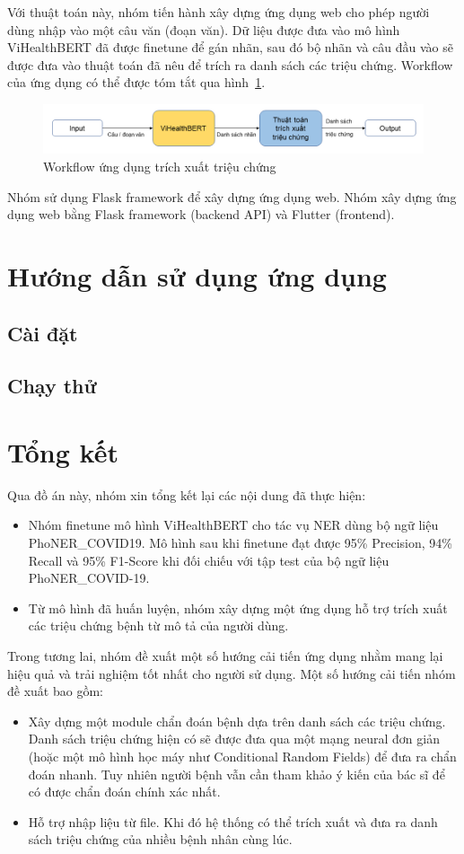 \documentclass[12pt]{article}
\begin{document}
Với thuật toán này, nhóm tiến hành xây dựng ứng dụng web cho phép người dùng nhập vào một câu văn (đoạn văn). Dữ liệu được đưa vào mô hình ViHealthBERT đã được finetune để gán nhãn, sau đó bộ nhãn và câu đầu vào sẽ được đưa vào thuật toán đã nêu để trích ra danh sách các triệu chứng. Workflow của ứng dụng có thể được tóm tắt qua hình~\ref{fig:workflow}.
\begin{figure}
\centering
\includegraphics[scale=.6]{img/workflow.png}
\caption{Workflow ứng dụng trích xuất triệu chứng}
\label{fig:workflow}
\end{figure}
Nhóm sử dụng Flask framework để xây dựng ứng dụng web.
Nhóm xây dựng ứng dụng web bằng Flask framework (backend API) và Flutter (frontend).

\section{Hướng dẫn sử dụng ứng dụng}
\subsection{Cài đặt}

\subsection{Chạy thử}

\section{Tổng kết}
Qua đồ án này, nhóm xin tổng kết lại các nội dung đã thực hiện:
\begin{itemize}
\item Nhóm finetune mô hình ViHealthBERT cho tác vụ NER dùng bộ ngữ liệu PhoNER\_COVID19. Mô hình sau khi finetune đạt được 95\% Precision, 94\% Recall và 95\% F1-Score khi đối chiếu với tập test của bộ ngữ liệu PhoNER\_COVID-19.
\item Từ mô hình đã huấn luyện, nhóm xây dựng một ứng dụng hỗ trợ trích xuất các triệu chứng bệnh từ mô tả của người dùng.
\end{itemize}
Trong tương lai, nhóm đề xuất một số hướng cải tiến ứng dụng nhằm mang lại hiệu quả và trải nghiệm tốt nhất cho người sử dụng. Một số hướng cải tiến nhóm đề xuất bao gồm:
\begin{itemize}
\item Xây dựng một module chẩn đoán bệnh dựa trên danh sách các triệu chứng. Danh sách triệu chứng hiện có sẽ được đưa qua một mạng neural đơn giản (hoặc một mô hình học máy như Conditional Random Fields) để đưa ra chẩn đoán nhanh. Tuy nhiên người bệnh vẫn cần tham khảo ý kiến của bác sĩ để có được chẩn đoán chính xác nhất.
\item Hỗ trợ nhập liệu từ file. Khi đó hệ thống có thể trích xuất và đưa ra danh sách triệu chứng của nhiều bệnh nhân cùng lúc.
\end{itemize}


{}
{}


\end{document}
